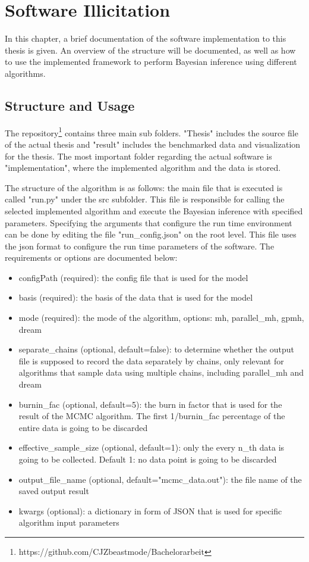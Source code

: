 \chapter{Software Illicitation}
In this chapter, a brief documentation of the software implementation to this thesis is given. An overview of the structure will be documented, as well as how to use the implemented framework to perform Bayesian inference using different algorithms.

\section{Structure and Usage}
The repository\footnote{https://github.com/CJZbeastmode/Bachelorarbeit} contains three main sub folders. "Thesis" includes the source file of the actual thesis and "result" includes the benchmarked data and visualization for the thesis. The most important folder regarding the actual software is "implementation", where the implemented algorithm and the data is stored.

The structure of the algorithm is as follows: the main file that is executed is called "run.py" under the src subfolder. This file is responsible for calling the selected implemented algorithm and execute the Bayesian inference with specified parameters. Specifying the arguments that configure the run time environment can be done by editing the file "run\_config.json" on the root level. This file uses the json format to configure the run time parameters of the software. The requirements or options are documented below:

\begin{itemize}
    \item configPath (required): the config file that is used for the model
    \item basis (required): the basis of the data that is used for the model
    \item mode (required): the mode of the algorithm, options: mh, parallel\_mh, gpmh, dream
    \item separate\_chains (optional, default=false): to determine whether the output file is supposed to record the data separately by chains, only relevant for algorithms that sample data using multiple chains, including parallel\_mh and dream
    \item burnin\_fac (optional, default=5): the burn in factor that is used for the result of the MCMC algorithm. The first 1/burnin\_fac percentage of the entire data is going to be discarded
    \item effective\_sample\_size (optional, default=1): only the every n\_th data is going to be collected. Default 1: no data point is going to be discarded
    \item output\_file\_name (optional, default="mcmc\_data.out"): the file name of the saved output result
    \item kwargs (optional): a dictionary in form of JSON that is used for specific algorithm input parameters
\end{itemize}

